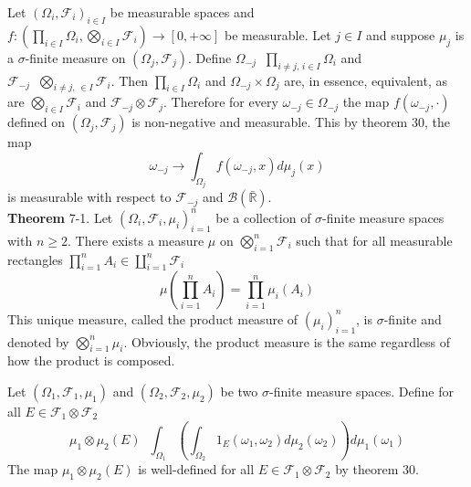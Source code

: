 \documentclass[a4paper]{article}
\newcommand{\clo}[1]{\left [ #1 \right ]}
\newcommand{\brac}[1]{\left ( #1 \right )}
\newcommand{\Rbar}{{\bar{\mathbb{R}}}}
\newcommand{\Zinf}{\clo{ 0, +\infty }}
\newcommand{\Fcal}{\mathcal{F}}
\newcommand{\borel}[1]{\mathcal{B}\brac{#1}}
\newcommand{\defn}{\mathop{\overset{\Delta}{=}}\nolimits}
\begin{document}
Let $\brac{\Omega_i, \Fcal_i}_{i\in I}$ be measurable spaces and $f:\brac{\prod_{i\in I}\Omega_i, \bigotimes_{i\in I}\Fcal_i}\to\Zinf$ be measurable. Let $j\in I$ and suppose $\mu_j$ is a $\sigma$-finite measure on $\brac{\Omega_j, \Fcal_j}$. Define $\Omega_{-j} \defn \prod_{i\neq j,\,i\in I}\Omega_i$ and $\Fcal_{-j} \defn\bigotimes_{i\neq j,\,\in I} \Fcal_i$. Then $\prod_{i\in I}\Omega_i$ and $\Omega_{-j} \times \Omega_j$ are, in essence, equivalent, as are $\bigotimes_{i\in I} \Fcal_i$ and $\Fcal_{-j}\otimes \Fcal_j$. Therefore for every $\omega_{-j}\in \Omega_{-j}$ the map $f\brac{\omega_{-j}, \cdot}$ defined on $\brac{\Omega_j, \Fcal_j}$ is non-negative and measurable. This by theorem 30, the map\[\omega_{-j}\to\int_{\Omega_j} f\brac{\omega_{-j}, x} d\mu_j\brac{x}\] is measurable with respect to $\Fcal_{-j}$ and $\borel{\Rbar}$.\\

\label{thm:product_meas} \noindent \textbf{Theorem} 7-1.
Let $\brac{\Omega_i, \Fcal_i, \mu_i}_{i=1}^n$ be a collection of $\sigma$-finite measure spaces with $n\geq 2$. There exists a measure $\mu$ on $\bigotimes_{i=1}^n \Fcal_i$ such that for all measurable rectangles $\prod_{i=1}^n A_i \in \coprod_{i=1}^n \Fcal_i$ \[\mu\brac{ \prod_{i=1}^n A_i } = \prod_{i=1}^n \mu_i\brac{A_i}\] This unique measure, called the product measure of $\brac{\mu_i}_{i=1}^n$, is $\sigma$-finite and denoted by $\bigotimes_{i=1}^n \mu_i$. Obviously, the product measure is the same regardless of how the product is composed.

Let $\brac{\Omega_1, \Fcal_1, \mu_1}$ and $\brac{\Omega_2, \Fcal_2, \mu_2}$ be two $\sigma$-finite measure spaces. Define for all $E\in \Fcal_1\otimes\Fcal_2$ \[\mu_1\otimes\mu_2\brac{E} \defn \int_{\Omega_1}\brac{ \int_{\Omega_2}1_E\brac{\omega_1, \omega_2} d\mu_2\brac{\omega_2} }d\mu_1\brac{\omega_1}\]
The map $\mu_1\otimes\mu_2\brac{E}$ is well-defined for all $E\in \Fcal_1\otimes\Fcal_2$ by theorem 30.
\end{document}
